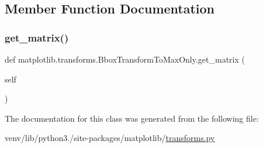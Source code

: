 \subsection{Member Function Documentation}
\mbox{\label{classmatplotlib_1_1transforms_1_1BboxTransformToMaxOnly_adf9bce8b822f41ab027488422e46dd11}} 
\subsubsection{\texorpdfstring{get\+\_\+matrix()}{get\_matrix()}}
{\footnotesize\ttfamily def matplotlib.\+transforms.\+Bbox\+Transform\+To\+Max\+Only.\+get\+\_\+matrix (\begin{DoxyParamCaption}\item[{}]{self }\end{DoxyParamCaption})}



The documentation for this class was generated from the following file\+:\begin{DoxyCompactItemize}
\item 
venv/lib/python3./site-\/packages/matplotlib/\hyperlink{transforms_8py}{transforms.\+py}\end{DoxyCompactItemize}
